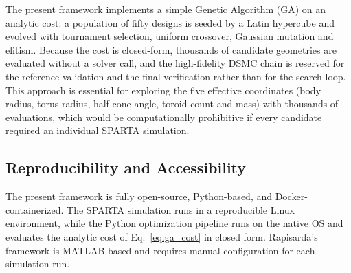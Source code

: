 The present framework implements a simple Genetic Algorithm (GA) on an analytic cost: a population of fifty designs is seeded by a Latin hypercube and evolved with tournament selection, uniform crossover, Gaussian mutation and elitism. Because the cost is closed-form, thousands of candidate geometries are evaluated without a solver call, and the high-fidelity DSMC chain is reserved for the reference validation and the final verification rather than for the search loop. This approach is essential for exploring the five effective coordinates (body radius, torus radius, half-cone angle, toroid count and mass) with thousands of evaluations, which would be computationally prohibitive if every candidate required an individual SPARTA simulation.


\subsection{Reproducibility and Accessibility}
The present framework is fully open-source, Python-based, and Docker-containerized. The SPARTA simulation runs in a reproducible Linux environment, while the Python optimization pipeline runs on the native OS and evaluates the analytic cost of Eq.~\eqref{eq:ga_cost} in closed form. Rapisarda's framework is MATLAB-based and requires manual configuration for each simulation run.


